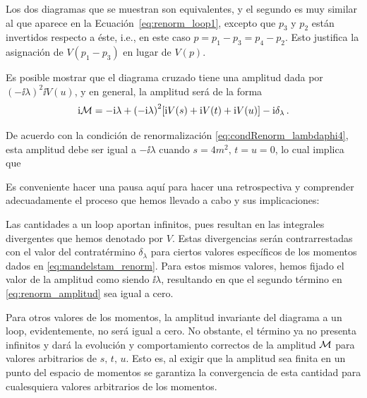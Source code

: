 Los dos diagramas que se muestran son equivalentes, y el segundo es muy similar al que aparece en la Ecuación~\eqref{eq:renorm_loop1}, excepto que $p_3$ y $p_2$ están invertidos respecto a éste, i.e., en este caso $p = p_1 - p_3 = p_4 - p_2$. Esto justifica la asignación de $V(p_1 - p_3)$ en lugar de $V(p)$.

Es posible mostrar que el diagrama cruzado tiene una amplitud dada por $(-\ii \lambda)^2  \ii V(u)$, y en general, la amplitud será de la forma
%
\begin{equation}
	\mathrm{i} \mathcal{M} = -\mathrm{i} \lambda + \qty(-\mathrm{i} \lambda)^2 \qty[\mathrm{i} V(s) + \mathrm{i} V(t) + \mathrm{i} V(u)] - \mathrm{i} \delta_\lambda \,.
\label{eq:renorm_amplitud}
\end{equation}

De acuerdo con la condición de renormalización \eqref{eq:condRenorm_lambdaphi4}, esta amplitud debe ser igual a $-\ii \lambda$ cuando $s=4m^2,\, t=u=0$, lo cual implica que
%

Es conveniente hacer una pausa aquí para hacer una retrospectiva y comprender adecuadamente el proceso que hemos llevado a cabo y sus implicaciones:

\begin{cabox}
	Las cantidades a un loop aportan infinitos, pues resultan en las integrales divergentes que hemos denotado por $V$. Estas divergencias serán contrarrestadas con el valor del contratérmino $\delta_\lambda$ para ciertos valores específicos de los momentos dados en \eqref{eq:mandelstam_renorm}. Para estos mismos valores, hemos fijado el valor de la amplitud como siendo $\ii \lambda$, resultando en que el segundo término en \eqref{eq:renorm_amplitud} sea igual a cero.
	
	Para otros valores de los momentos, la amplitud invariante del diagrama a un loop, evidentemente, no será igual a cero. No obstante, el término ya no presenta infinitos y dará la evolución y comportamiento correctos de la amplitud $\mathcal{M}$ para valores arbitrarios de $s,\, t,\, u$. Esto es, al exigir que la amplitud sea finita en un punto del espacio de momentos se garantiza la convergencia de esta cantidad para cualesquiera valores arbitrarios de los momentos.
\end{cabox}

